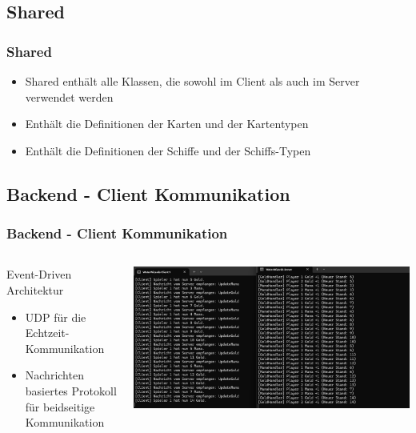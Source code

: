 \documentclass{beamer}
\begin{document}
\subsection{Shared}
\begin{frame}
\frametitle{Shared}
  \begin{itemize}
    \item Shared enthält alle Klassen, die sowohl im Client als auch im Server verwendet werden
    \item Enthält die Definitionen der Karten und der Kartentypen
    \item Enthält die Definitionen der Schiffe und der Schiffs-Typen
  \end{itemize}
\end{frame}

\subsection{Backend - Client Kommunikation}
\begin{frame}
\frametitle{Backend - Client Kommunikation}
\begin{columns}
  \begin{column}{0.45\textwidth}
    Event-Driven Architektur
    \begin{itemize}
      \item UDP für die Echtzeit-Kommunikation
      \item Nachrichten basiertes Protokoll für beidseitige Kommunikation
    \end{itemize}
  \end{column}
  \begin{column}{0.55\textwidth}
    \includegraphics[width=\textwidth]{Server-Client-Logs.png}
  \end{column}
\end{columns}
\end{frame}
\end{document}
